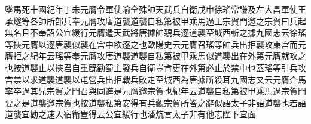 墜馬死十國紀年丁未元膺令軍使喻全殊帥天武兵自衛戊申徐瑤常謙及左大昌軍使王承燧等各帥所部兵奉元膺攻唐道襲道襲自私第被甲乘馬過王宗賀門邀之宗賀曰兵起無名且不奉詔公宜緩行元膺遣天武將唐據帥親兵逐道襲至城西斬之據九國志云徐瑤等挾元膺以逐唐襲似襲在宫中欲逐之也歐陽史云元膺召瑤等帥兵出拒襲攻東宫而元膺拒之紀年云瑤等奉元膺攻唐道襲道襲自私第被甲乘馬似道襲出在外第元膺就攻之也按道襲止以挾君自重旣勸蜀主發兵自衛豈肯更在外第必止於禁中也蓋瑤等引兵攻宫禁以求道襲道襲以屯營兵出拒戰兵敗走至城西為唐據所殺耳九國志又云元膺介馬率卒過其兄宗賀之門召與同進是元膺邀宗賀也紀年云道襲自私第被甲乘馬過宗賀門要之是道襲邀宗賀也按道襲私第安得有兵觀宗賀所答之辭似語太子非語道襲也若語道襲宜勸之速入宿衛豈得云公宜緩行也潘炕言太子非有他志陛下宜面